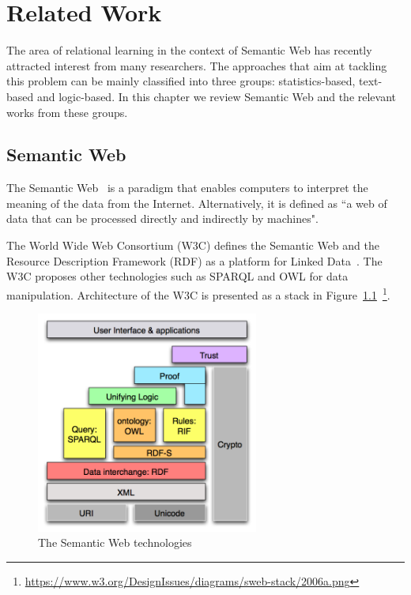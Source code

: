 \chapter{Related Work}
\label{chap:relwork}

The area of relational learning in the context of Semantic Web has recently attracted interest from many researchers. The approaches that aim at tackling this problem can be mainly classified into three groups: statistics-based, text-based and logic-based. In this chapter we review Semantic Web and the relevant works from these groups.

\section{Semantic Web}

The Semantic Web~\cite{ref26} is a paradigm that enables computers to interpret the meaning of the data from the Internet. Alternatively, it is defined as ``a web of data that can be processed directly and indirectly by machines".

The World Wide Web Consortium (W3C) defines the Semantic Web and the Resource Description Framework (RDF) as a platform for Linked Data~\cite{ref26}. The W3C proposes other technologies such as SPARQL and OWL for data manipulation. Architecture of the W3C is presented as a stack in Figure~\ref{fig1}~\footnote{\url{https://www.w3.org/DesignIssues/diagrams/sweb-stack/2006a.png}}.

\begin{figure}
\centering
\includegraphics[width=0.65\textwidth]{figures/semantic_web.png}
\caption{The Semantic Web technologies}
\label{fig1}
\end{figure}

